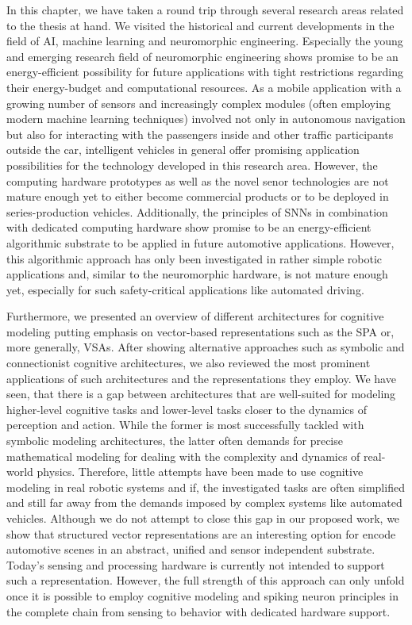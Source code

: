 In this chapter, we have taken a round trip through several research areas related to the thesis at hand.
We visited the historical and current developments in the field of \ac{AI}, machine learning and neuromorphic engineering.
Especially the young and emerging research field of neuromorphic engineering shows promise to be an energy-efficient possibility for future applications with tight restrictions regarding their energy-budget and computational resources.
As a mobile application with a growing number of sensors and increasingly complex modules (often employing modern machine learning techniques) involved not only in autonomous navigation but also for interacting with the passengers inside and other traffic participants outside the car, intelligent vehicles in general offer promising application possibilities for the technology developed in this research area.
However, the computing hardware prototypes \parencite{Furber2014, Akopyan2015, Davies2018} as well as the novel senor technologies \parencite{Lichtsteiner2008} are not mature enough yet to either become commercial products or to be deployed in series-production vehicles.
Additionally, the principles of \acp{SNN} in combination with dedicated computing hardware show promise to be an energy-efficient algorithmic substrate to be applied in future automotive applications.
However, this algorithmic approach has only been investigated in rather simple robotic applications \parencite{Conradt2014, Stewart2016, Galluppi2014} and, similar to the neuromorphic hardware, is not mature enough yet, especially for such safety-critical applications like automated driving.

Furthermore, we presented an overview of different architectures for cognitive modeling putting emphasis on vector-based representations such as the \ac{SPA} or, more generally, \acp{VSA}.
After showing alternative approaches such as symbolic and connectionist cognitive architectures, we also reviewed the most prominent applications of such architectures and the representations they employ.
We have seen, that there is a gap between architectures that are well-suited for modeling higher-level cognitive tasks and lower-level tasks closer to the dynamics of perception and action.
While the former is most successfully tackled with symbolic modeling architectures, the latter often demands for precise mathematical modeling for dealing with the complexity and dynamics of real-world physics.
Therefore, little attempts have been made to use cognitive modeling in real robotic systems and if, the investigated tasks are often simplified \parencite{Neubert2016} and still far away from the demands imposed by complex systems like automated vehicles.
Although we do not attempt to close this gap in our proposed work, we show that structured vector representations are an interesting option for encode automotive scenes in an abstract, unified and sensor independent substrate.
Today's sensing and processing hardware is currently not intended to support such a representation.
However, the full strength of this approach can only unfold once it is possible to employ cognitive modeling and spiking neuron principles in the complete chain from sensing to behavior with dedicated hardware support.

